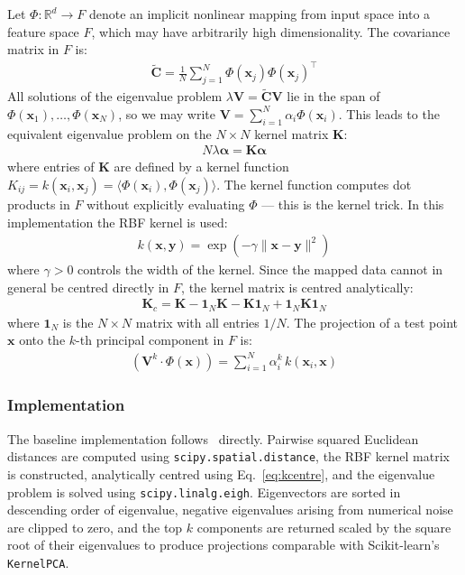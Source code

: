 Let $\Phi : \mathbb{R}^d \to F$ denote an implicit nonlinear mapping from input space into a feature space $F$, which may have arbitrarily high dimensionality. The covariance matrix in $F$ is:
\begin{align}
    \tilde{\mathbf{C}} = \frac{1}{N} \sum_{j=1}^{N}
    \Phi(\mathbf{x}_j)\Phi(\mathbf{x}_j)^\top
\end{align}
All solutions of the eigenvalue problem $\lambda \mathbf{V} =
\tilde{\mathbf{C}}\mathbf{V}$ lie in the span of
$\Phi(\mathbf{x}_1), \ldots, \Phi(\mathbf{x}_N)$, so we may write
$\mathbf{V} = \sum_{i=1}^{N} \alpha_i \Phi(\mathbf{x}_i)$. This leads to
the equivalent eigenvalue problem on the $N \times N$ kernel matrix
$\mathbf{K}$:
\begin{align}
    N\lambda\boldsymbol{\alpha} = \mathbf{K}\boldsymbol{\alpha} \label{eq:kpca}
\end{align}
where entries of $\mathbf{K}$ are defined by a kernel function
$K_{ij} = k(\mathbf{x}_i, \mathbf{x}_j) = \langle\Phi(\mathbf{x}_i),
\Phi(\mathbf{x}_j)\rangle$. The kernel function computes dot products in $F$
without explicitly evaluating $\Phi$ --- this is the kernel trick. In this
implementation the RBF kernel is used:
\begin{align}
    k(\mathbf{x}, \mathbf{y}) = \exp\left(-\gamma \|\mathbf{x} -
    \mathbf{y}\|^2\right)
\end{align}
where $\gamma > 0$ controls the width of the kernel. Since the mapped data
cannot in general be centred directly in $F$, the kernel matrix is centred
analytically:
\begin{align}
    \mathbf{K}_c = \mathbf{K} - \mathbf{1}_N\mathbf{K}
    - \mathbf{K}\mathbf{1}_N + \mathbf{1}_N\mathbf{K}\mathbf{1}_N
    \label{eq:kcentre}
\end{align}
where $\mathbf{1}_N$ is the $N \times N$ matrix with all entries $1/N$. The
projection of a test point $\mathbf{x}$ onto the $k$-th principal component
in $F$ is:
\begin{align}
    \left(\mathbf{V}^k \cdot \Phi(\mathbf{x})\right)
    = \sum_{i=1}^{N} \alpha_i^k \, k(\mathbf{x}_i, \mathbf{x})
\end{align}

\subsubsection*{Implementation}

The baseline implementation follows~\citet{scholkopf1997kernel} directly.
Pairwise squared Euclidean distances are computed using
\texttt{scipy.spatial.distance}, the RBF kernel matrix is constructed,
analytically centred using Eq.~\ref{eq:kcentre}, and the eigenvalue problem
is solved using \texttt{scipy.linalg.eigh}. Eigenvectors are sorted in
descending order of eigenvalue, negative eigenvalues arising from numerical
noise are clipped to zero, and the top $k$ components are returned scaled by
the square root of their eigenvalues to produce projections comparable with
Scikit-learn's \texttt{KernelPCA}.

